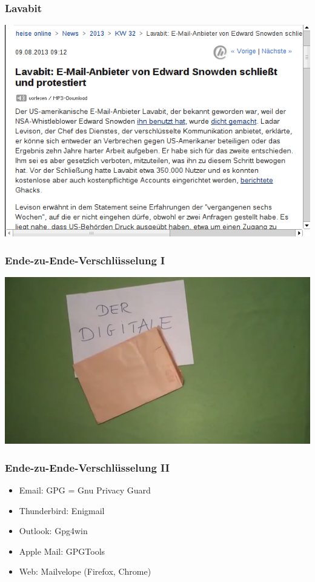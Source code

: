\documentclass[12pt]{beamer}
\begin{document}
\begin{frame}
    \frametitle{Lavabit}
    \begin{center}
	\includegraphics[height=0.6\textheight]{img/heise_lavabit.png}
    \end{center}
\end{frame}

\begin{frame}
  \frametitle{Ende-zu-Ende-Verschlüsselung I}
  \begin{center}
	\includegraphics[height=0.6\textheight]{img/gpgvideo.png}
  \end{center}
\end{frame}

\begin{frame}
    \frametitle{Ende-zu-Ende-Verschlüsselung II}
    \begin{itemize}\Large
      \item Email: GPG = Gnu Privacy Guard
      \item Thunderbird: Enigmail
      \item Outlook: Gpg4win
      \item Apple Mail: GPGTools
      \item Web: Mailvelope (Firefox, Chrome)
    \end{itemize}
\end{frame}
\end{document}
